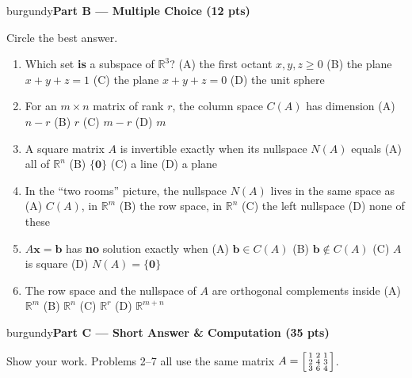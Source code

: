 \documentclass[10pt]{article}
\newcommand{\bb}{\mathbf{b}}
\newcommand{\xx}{\mathbf{x}}
\newcommand{\zero}{\mathbf{0}}
\newcommand{\parthead}[1]{%
  \vspace{6pt}\noindent
  \begin{headlinebox}{burgundy}{\color{white}\bfseries #1}\end{headlinebox}%
  \vspace{4pt}}
\begin{document}
\parthead{Part B --- Multiple Choice (12 pts)}
Circle the best answer.

\begin{enumerate}[leftmargin=1.9em, itemsep=9pt]
  \item Which set \textbf{is} a subspace of $\mathbb{R}^3$?
    \hfill (A) the first octant $x,y,z\ge 0$ \quad (B) the plane $x+y+z=1$ \quad (C) the plane $x+y+z=0$ \quad (D) the unit sphere
  \item For an $m\times n$ matrix of rank $r$, the column space $C(A)$ has dimension
    \hfill (A) $n-r$ \quad (B) $r$ \quad (C) $m-r$ \quad (D) $m$
  \item A square matrix $A$ is invertible exactly when its nullspace $N(A)$ equals
    \hfill (A) all of $\mathbb{R}^n$ \quad (B) $\{\zero\}$ \quad (C) a line \quad (D) a plane
  \item In the ``two rooms'' picture, the nullspace $N(A)$ lives in the same space as
    \hfill (A) $C(A)$, in $\mathbb{R}^m$ \quad (B) the row space, in $\mathbb{R}^n$ \quad (C) the left nullspace \quad (D) none of these
  \item $A\xx=\bb$ has \textbf{no} solution exactly when
    \hfill (A) $\bb\in C(A)$ \quad (B) $\bb\notin C(A)$ \quad (C) $A$ is square \quad (D) $N(A)=\{\zero\}$
  \item The row space and the nullspace of $A$ are orthogonal complements inside
    \hfill (A) $\mathbb{R}^m$ \quad (B) $\mathbb{R}^n$ \quad (C) $\mathbb{R}^r$ \quad (D) $\mathbb{R}^{m+n}$
\end{enumerate}

\parthead{Part C --- Short Answer \& Computation (35 pts)}
Show your work. Problems 2--7 all use the same matrix
$A=\begin{bsmallmatrix}1&2&1\\2&4&3\\3&6&4\end{bsmallmatrix}$.
\end{document}
